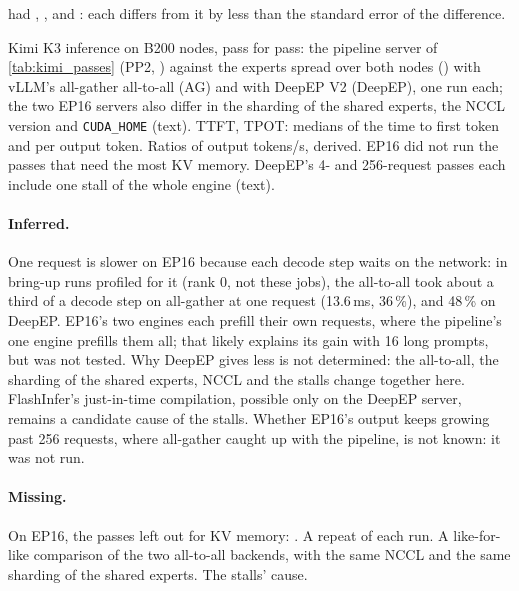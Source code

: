 had \TriKimiGsm, \TriKimiArc, \TriKimiGpqa{} and \TriKimiMmlu: each differs from it by less than the standard error of the difference.

\begin{table}[h]
  \caption{Kimi K3 inference on \TriKxnNodes{} B200 nodes, pass for pass: the pipeline server of \cref{tab:kimi_passes} (PP2, \TriKimiLayout) against the experts spread over both nodes (\TriKxnLayout) with vLLM's all-gather all-to-all (AG) and with DeepEP V2 (DeepEP), one run each; the two EP16 servers also differ in the sharding of the shared experts, the NCCL version and \texttt{CUDA\_HOME} (text). TTFT, TPOT: medians of the time to first token and per output token. Ratios of output tokens/s, derived. EP16 did not run the passes that need the most KV memory. DeepEP's 4- and 256-request passes each include one stall of the whole engine (text).}
  \label{tab:kimi_xn_passes}
  \centering\scriptsize
  \begin{adjustbox}{max width=\linewidth}
  \end{adjustbox}
\end{table}

\paragraph{Inferred.} One request is slower on EP16 because each decode step waits on the network: in bring-up runs profiled for it (rank 0, not these jobs), the all-to-all took about a third of a decode step on all-gather at one request (13.6\,ms, 36\,\%), and 48\,\% on DeepEP. EP16's two engines each prefill their own requests, where the pipeline's one engine prefills them all; that likely explains its gain with 16 long prompts, but was not tested. Why DeepEP gives less is not determined: the all-to-all, the sharding of the shared experts, NCCL and the stalls change together here. FlashInfer's just-in-time compilation, possible only on the DeepEP server, remains a candidate cause of the stalls. Whether EP16's output keeps growing past 256 requests, where all-gather caught up with the pipeline, is not known: it was not run.

\paragraph{Missing.} On EP16, the passes left out for KV memory: \TriKxnNotRun. A repeat of each run. A like-for-like comparison of the two all-to-all backends, with the same NCCL and the same sharding of the shared experts. The stalls' cause.

